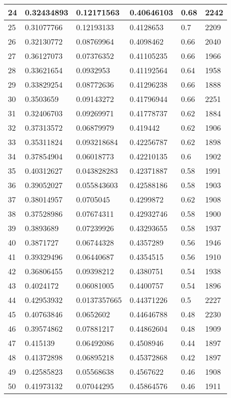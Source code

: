 \begin{longtable}{|l|l|l|l|l|l|}
24 & 0.32434893 & 0.12171563 & 0.40646103 & 0.68 & 2242 \\ \hline 
25 & 0.31077766 & 0.12193133 & 0.4128653 & 0.7 & 2209 \\ \hline 
26 & 0.32130772 & 0.08769964 & 0.4098462 & 0.66 & 2040 \\ \hline 
27 & 0.36127073 & 0.07376352 & 0.41105235 & 0.66 & 1966 \\ \hline 
28 & 0.33621654 & 0.0932953 & 0.41192564 & 0.64 & 1958 \\ \hline 
29 & 0.33829254 & 0.08772636 & 0.41296238 & 0.66 & 1888 \\ \hline 
30 & 0.3503659 & 0.09143272 & 0.41796944 & 0.66 & 2251 \\ \hline 
31 & 0.32406703 & 0.09269971 & 0.41778737 & 0.62 & 1884 \\ \hline 
32 & 0.37313572 & 0.06879979 & 0.419442 & 0.62 & 1906 \\ \hline 
33 & 0.35311824 & 0.093218684 & 0.42256787 & 0.62 & 1898 \\ \hline 
34 & 0.37854904 & 0.06018773 & 0.42210135 & 0.6 & 1902 \\ \hline 
35 & 0.40312627 & 0.043828283 & 0.42371887 & 0.58 & 1991 \\ \hline 
36 & 0.39052027 & 0.055843603 & 0.42588186 & 0.58 & 1903 \\ \hline 
37 & 0.38014957 & 0.0705045 & 0.4299872 & 0.62 & 1908 \\ \hline 
38 & 0.37528986 & 0.07674311 & 0.42932746 & 0.58 & 1900 \\ \hline 
39 & 0.3893689 & 0.07239926 & 0.43293655 & 0.58 & 1937 \\ \hline 
40 & 0.3871727 & 0.06744328 & 0.4357289 & 0.56 & 1946 \\ \hline 
41 & 0.39329496 & 0.06440687 & 0.4354515 & 0.56 & 1910 \\ \hline 
42 & 0.36806455 & 0.09398212 & 0.4380751 & 0.54 & 1938 \\ \hline 
43 & 0.4024172 & 0.06081005 & 0.4400757 & 0.54 & 1896 \\ \hline 
44 & 0.42953932 & 0.0137357665 & 0.44371226 & 0.5 & 2227 \\ \hline 
45 & 0.40763846 & 0.0652602 & 0.44646788 & 0.48 & 2230 \\ \hline 
46 & 0.39574862 & 0.07881217 & 0.44862604 & 0.48 & 1909 \\ \hline 
47 & 0.415139 & 0.06492086 & 0.4508946 & 0.44 & 1897 \\ \hline 
48 & 0.41372898 & 0.06895218 & 0.45372868 & 0.42 & 1897 \\ \hline 
49 & 0.42585823 & 0.05568638 & 0.4567622 & 0.46 & 1908 \\ \hline 
50 & 0.41973132 & 0.07044295 & 0.45864576 & 0.46 & 1911 \\ \hline 
\end{longtable}